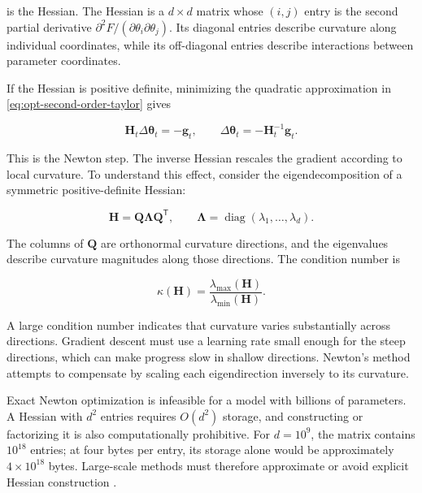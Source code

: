 is the Hessian. The Hessian is a $d\times d$ matrix whose $(i,j)$ entry
is the second partial derivative
$\partial^2F/(\partial\theta_i\partial\theta_j)$. Its diagonal entries
describe curvature along individual coordinates, while its
off-diagonal entries describe interactions between parameter
coordinates.

If the Hessian is positive definite, minimizing the quadratic
approximation in \cref{eq:opt-second-order-taylor} gives

\begin{equation}
    \mathbf{H}_t\Delta\boldsymbol{\theta}_t
    =
    -\mathbf{g}_t,
    \qquad
    \Delta\boldsymbol{\theta}_t
    =
    -\mathbf{H}_t^{-1}\mathbf{g}_t.
    \label{eq:opt-newton-step}
\end{equation}

This is the Newton step. The inverse Hessian rescales the gradient
according to local curvature. To understand this effect, consider the
eigendecomposition of a symmetric positive-definite Hessian:

\begin{equation}
    \mathbf{H}
    =
    \mathbf{Q}\boldsymbol{\Lambda}\mathbf{Q}^{\mathsf{T}},
    \qquad
    \boldsymbol{\Lambda}
    =
    \operatorname{diag}(\lambda_1,\ldots,\lambda_d).
    \label{eq:opt-hessian-eigendecomposition}
\end{equation}

The columns of $\mathbf{Q}$ are orthonormal curvature directions, and
the eigenvalues describe curvature magnitudes along those directions.
The condition number is

\begin{equation}
    \kappa(\mathbf{H})
    =
    \frac{\lambda_{\max}(\mathbf{H})}
         {\lambda_{\min}(\mathbf{H})}.
    \label{eq:opt-hessian-condition}
\end{equation}

A large condition number indicates that curvature varies substantially
across directions. Gradient descent must use a learning rate small
enough for the steep directions, which can make progress slow in
shallow directions. Newton's method attempts to compensate by scaling
each eigendirection inversely to its curvature.

Exact Newton optimization is infeasible for a model with billions of
parameters. A Hessian with $d^2$ entries requires $O(d^2)$ storage, and
constructing or factorizing it is also computationally prohibitive.
For $d=10^9$, the matrix contains $10^{18}$ entries; at four bytes per
entry, its storage alone would be approximately $4\times10^{18}$ bytes.
Large-scale methods must therefore approximate or avoid explicit
Hessian construction \parencite{Bottou2018Optimization,Ranganath2026Navigating}.

